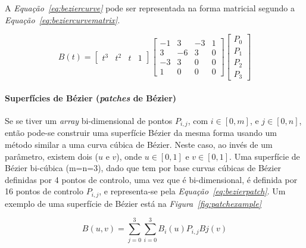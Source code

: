 A \emph{Equação~\ref{eq:beziercurve}} pode ser representada na forma matricial
segundo a \emph{Equação~\ref{eq:beziercurvematrix}}. 

\begin{equation}
B(t)= \begin{bmatrix}
       t^{3} & t^{2} & t & 1          
		\end{bmatrix}
		\begin{bmatrix}
		       -1 & 3 & -3  & 1 \\
		        3 & -6 &  3 & 0 \\
		       -3 & 3 & 0 & 0   \\
		        1 & 0 & 0 & 0
		\end{bmatrix}
		 \begin{bmatrix}
		       P_{0}   \\
		       P_{1}   \\
		       P_{2}   \\
		       P_{3}
		     \end{bmatrix}
\label{eq:beziercurvematrix}
\end{equation}

\newpage
\paragraph{Superfícies de Bézier (\emph{patches} de Bézier)}

Se se tiver um \emph{array} bi-dimensional de pontos
$P_{i,j}$, com $i\in[0, m]$, e $j\in[0,n]$, então pode-se
construir uma superfície Bézier da mesma forma usando um método similar a uma
curva cúbica de Bézier. Neste caso, ao invés de um parâmetro, existem dois
($u$ e $v$), onde $u\in[0,1]$ e $v\in[0,1]$.
Uma superfície de Bézier bi-cúbica (m=n=3), dado que tem por base curvas cúbicas
de Bézier definidas por 4 pontos de controlo, uma vez que é bi-dimensional, é definida por 16 pontos de
controlo $P_{i,j}$, e  representa-se pela \emph{Equação~\ref{eq:bezierpatch}}. Um
exemplo de uma superfície de Bézier está na \emph{Figura~\ref{fig:patchexample}} 

\begin{equation}
B(u,v)=\sum_{j=0}^{3}\sum_{i=0}^{3}B_{i}(u)P_{i,j}B{j}(v)
\label{eq:bezierpatch}
\end{equation}



